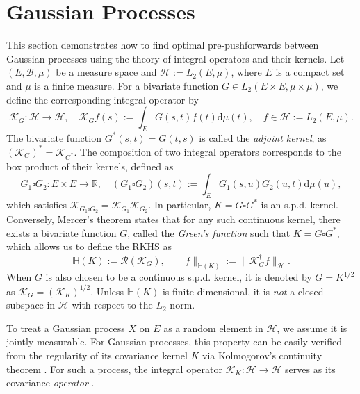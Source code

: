 \documentclass[noinfoline]{imsart}\setcounter{tocdepth}{2}
\renewcommand{\b}[1]{\mathbb{#1}} %
\newcommand{\s}[1]{\mathscr{#1}} %
\renewcommand{\c}[1]{\mathcal{#1}} %
\newcommand{\rd}{\mathrm{d}} %
\theoremstyle{plain}
\begin{document}
\section{Gaussian Processes}\label{sec:Gproc}
This section demonstrates how to find optimal pre-pushforwards between Gaussian processes using the theory of integral operators and their kernels.
Let $(E, \s{B}, \mu)$ be a measure space and $\c{H} := L_{2} (E, \mu)$, where $E$ is a compact set and $\mu$ is a finite measure. For a bivariate function $G \in L_{2}(E \times E, \mu \times \mu)$, we define the corresponding integral operator by
\begin{equation*}
    \s{K}_{G}: \c{H} \rightarrow \c{H}, \quad \s{K}_{G} f(s) := \int_{E} G(s, t) f(t) \rd \mu (t), \quad f \in \c{H} := L_{2} (E, \mu).
\end{equation*}
The bivariate function $G^{*}(s, t) = G(t, s)$ is called the \emph{adjoint kernel}, as $(\s{K}_{G})^{*} = \s{K}_{G^{*}}$. The composition of two integral operators corresponds to the box product of their kernels, defined as
\begin{equation*}
    G_{1} \square G_{2}: E \times E \rightarrow \b{R}, \quad (G_{1} \square G_{2})(s, t) := \int_{E} G_{1}(s, u) G_{2}(u, t) \rd \mu(u),
\end{equation*}
which satisfies $\s{K}_{G_{1} \square G_{2}} = \s{K}_{G_{1}} \s{K}_{G_{2}}$. In particular, $K = G \square G^{*}$ is an s.p.d. kernel. Conversely, Mercer's theorem \cite{mercer1909xvi} states that for any such continuous kernel, there exists a bivariate function $G$, called the \emph{Green's function} such that $K = G \square G^{*}$, which allows us to define the RKHS \cite{paulsen2016introduction} as
\begin{equation*}
    \b{H}(K) := \c{R}(\s{K}_{G}), \quad \|f\|_{\b{H}(K)} := \| \s{K}_{G}^{\dagger} f \|_{\c{H}}.
\end{equation*}
When $G$ is also chosen to be a continuous s.p.d. kernel, it is denoted by $G = K^{1/2}$ as $\s{K}_{G} = (\s{K}_{K})^{1/2}$. Unless $\b{H}(K)$ is finite-dimensional, it is \emph{not} a closed subspace in $\c{H}$ with respect to the $L_{2}$-norm.

To treat a Gaussian process $X$ on $E$ as a random element in $\c{H}$, we assume it is jointly measurable. For Gaussian processes, this property can be easily verified from the regularity of its covariance kernel $K$ via Kolmogorov's continuity theorem \cite{da2006introduction,kallenberg1997foundations,hairer2009introduction}. For such a process, the integral operator $\s{K}_{K}: \c{H} \rightarrow \c{H}$ serves as its covariance \emph{operator} \cite{hsing2015theoretical}.
\end{document}
